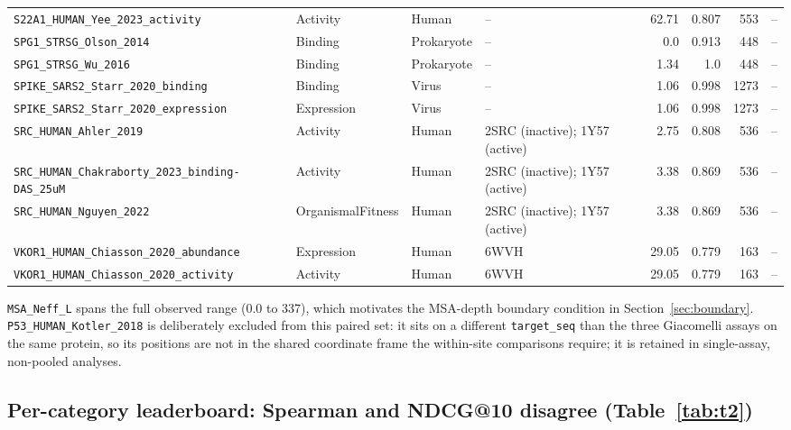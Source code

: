 \documentclass{article}
\begin{document}
\begin{longtable}{llllrrrr}
  \texttt{\scriptsize S22A1\_HUMAN\_Yee\_2023\_activity} & Activity & Human & {\scriptsize --} & 62.71 & 0.807 & 553 & -- \\
  \texttt{\scriptsize SPG1\_STRSG\_Olson\_2014} & Binding & Prokaryote & {\scriptsize --} & 0.0 & 0.913 & 448 & -- \\
  \texttt{\scriptsize SPG1\_STRSG\_Wu\_2016} & Binding & Prokaryote & {\scriptsize --} & 1.34 & 1.0 & 448 & -- \\
  \texttt{\scriptsize SPIKE\_SARS2\_Starr\_2020\_binding} & Binding & Virus & {\scriptsize --} & 1.06 & 0.998 & 1273 & -- \\
  \texttt{\scriptsize SPIKE\_SARS2\_Starr\_2020\_expression} & Expression & Virus & {\scriptsize --} & 1.06 & 0.998 & 1273 & -- \\
  \texttt{\scriptsize SRC\_HUMAN\_Ahler\_2019} & Activity & Human & {\scriptsize 2SRC (inactive); 1Y57 (active)} & 2.75 & 0.808 & 536 & -- \\
  \texttt{\scriptsize SRC\_HUMAN\_Chakraborty\_2023\_binding-DAS\_25uM} & Activity & Human & {\scriptsize 2SRC (inactive); 1Y57 (active)} & 3.38 & 0.869 & 536 & -- \\
  \texttt{\scriptsize SRC\_HUMAN\_Nguyen\_2022} & OrganismalFitness & Human & {\scriptsize 2SRC (inactive); 1Y57 (active)} & 3.38 & 0.869 & 536 & -- \\
  \texttt{\scriptsize VKOR1\_HUMAN\_Chiasson\_2020\_abundance} & Expression & Human & {\scriptsize 6WVH} & 29.05 & 0.779 & 163 & -- \\
  \texttt{\scriptsize VKOR1\_HUMAN\_Chiasson\_2020\_activity} & Activity & Human & {\scriptsize 6WVH} & 29.05 & 0.779 & 163 & -- \\
\end{longtable}
\normalsize
\raggedright\footnotesize \texttt{MSA\_Neff\_L} spans the full observed range (0.0 to 337), which motivates the MSA-depth boundary condition in Section~\ref{sec:boundary}. \texttt{P53\_HUMAN\_Kotler\_2018} is deliberately excluded from this paired set: it sits on a different \texttt{target\_seq} than the three Giacomelli assays on the same protein, so its positions are not in the shared coordinate frame the within-site comparisons require; it is retained in single-assay, non-pooled analyses.

\FloatBarrier
\subsection{Per-category leaderboard: Spearman and NDCG@10 disagree (Table~\ref{tab:t2})}
\end{document}
